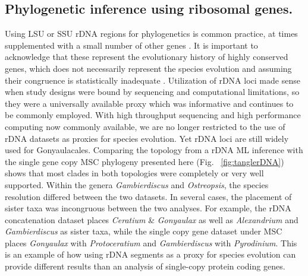 \documentclass[12pt]{article}
\begin{document}
\subsection*{Phylogenetic inference using ribosomal genes.}
\FloatBarrier 
Using LSU or SSU rDNA regions for phylogenetics is common practice, at times supplemented with a small number of other genes \cite{shalchian2006combined,zhang2007three,saldarriaga2004molecular,murray2005improving,hoppenrath2010dinoflagellate}. 
It is important to acknowledge that these represent the evolutionary history of highly conserved genes, which does not necessarily represent the species evolution and assuming their congruence is statistically inadequate \cite{degnan2009gene}.
Utilization of rDNA loci made sense when study designs were bound by sequencing and computational limitations, so they were a universally available proxy which was informative and continues to be commonly employed. 
With high throughput sequencing and high performance computing now commonly available, we are no longer restricted to the use of rDNA datasets as proxies for species evolution. 
Yet rDNA loci are still widely used for Gonyaulacales. 
Comparing the topology from a rDNA ML inference with the single gene copy MSC phylogeny presented here (Fig. ~\ref{fig:tanglerDNA}) shows that most clades in both topologies were completely or very well supported. 
Within the genera \emph{Gambierdiscus} and \emph{Ostreopsis}, the species resolution differed between the two datasets. 
In several cases, the placement of sister taxa was incongruous between the two analyses. 
For example, the rDNA concatenation dataset places \emph{Ceratium} \& \emph{Gonyaulax} as well as \emph{Alexandrium} and \emph{Gambierdiscus} as sister taxa, while the single copy gene dataset under MSC places \emph{Gonyaulax} with \emph{Protoceratium} and \emph{Gambierdiscus} with \emph{Pyrodinium}. 
This is an example of how using rDNA segments as a proxy for species evolution can provide different results than an analysis of single-copy protein coding genes.
\end{document}
